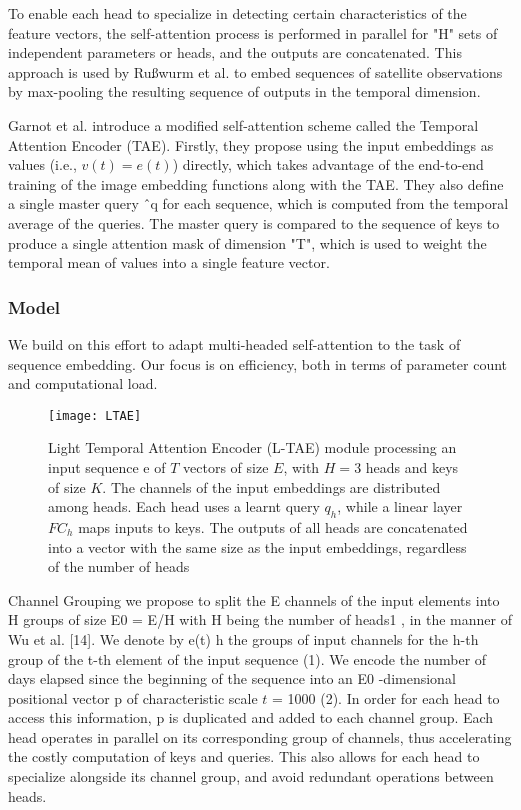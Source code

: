 To enable each head to specialize in detecting certain characteristics of the feature vectors, the self-attention process is performed in parallel for "H" sets of independent parameters or heads, and the outputs are concatenated.
This approach is used by Rußwurm et al. \cite{russwurm2019self} to embed sequences of satellite observations by max-pooling the resulting sequence of outputs in the temporal dimension.

Garnot et al. \cite{garnot2020satellite} introduce a modified self-attention scheme called the Temporal Attention Encoder (TAE).
Firstly, they propose using the input embeddings as values (i.e., $v(t) = e(t)$) directly, which takes advantage of the end-to-end training of the image embedding functions along with the TAE.
They also define a single master query ˆq for each sequence, which is computed from the temporal average of the queries.
The master query is compared to the sequence of keys to produce a single attention mask of dimension "T", which is used to weight the temporal mean of values into a single feature vector.



\subsubsection{Model}
We build on this effort to adapt multi-headed self-attention to the task of sequence embedding. Our focus is on efficiency, both in terms of parameter count
and computational load.

\begin{figure}[!htbp]
  \centering
  \texttt{[image: LTAE]}
  \caption{Light Temporal Attention Encoder  (L-TAE) module processing an input sequence e of $T$ vectors of
  size $E$, with $H = 3$ heads and keys of size $K$. The channels of the input embeddings
  are distributed among heads. Each head uses a learnt query $q_h$, while a linear layer
  $FC_h$ maps inputs to keys. The outputs of all heads are concatenated into a vector with
  the same size as the input embeddings, regardless of the number of heads \cite{LTAE}}
  \label{tab:LTAErchitecture}
\end{figure}

\begin{paragraph}{Channel Grouping} we propose to split the E channels of the input elements
into H groups of size E0 = E/H with H being the number of heads1
, in the
manner of Wu et al. [14]. We denote by e(t) h
the groups of input channels for the
h-th group of the t-th element of the input sequence (1).
We encode the number of days elapsed since the beginning of the sequence
into an E0 -dimensional positional vector p of characteristic scale $t$ = 1000 (2).
In order for each head to access this information, p is duplicated and added to
each channel group. Each head operates in parallel on its corresponding group
of channels, thus accelerating the costly computation of keys and queries. This
also allows for each head to specialize alongside its channel group, and avoid
redundant operations between heads.
\end{paragraph} 

